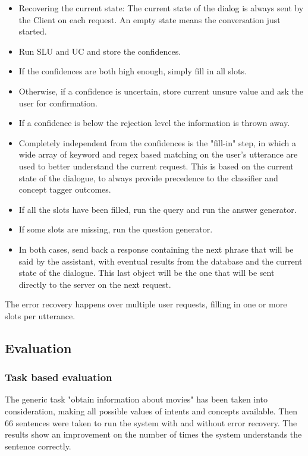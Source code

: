 \documentclass[11pt,a4paper]{article}
\begin{document}
\begin{itemize}
\item Recovering the current state: The current state of the dialog is always sent by the Client on each request. An empty state means the conversation just started.
\item Run SLU and UC and store the confidences.
\item If the confidences are both high enough, simply fill in all slots.
\item Otherwise, if a confidence is uncertain, store current unsure value and ask the user for confirmation.
\item If a confidence is below the rejection level the information is thrown away.
\item Completely independent from the confidences is the "fill-in" step, in which a wide array of keyword and regex based matching on the user's utterance are used to better understand the current request. This is based on the current state of the dialogue, to always provide precedence to the classifier and concept tagger outcomes.
\item If all the slots have been filled, run the query and run the answer generator.
\item If some slots are missing, run the question generator.
\item In both cases, send back a response containing the next phrase that will be said by the assistant, with eventual results from the database and the current state of the dialogue. This last object will be the one that will be sent directly to the server on the next request.
\end{itemize}

The error recovery happens over multiple user requests, filling in one or more slots per utterance.

\subsection{Evaluation}

\subsubsection{Task based evaluation}
The generic task "obtain information about movies" has been taken into consideration, making all possible values of intents and concepts available.
Then 66 sentences were taken to run the system with and without error recovery. The results show an improvement on the number of times the system understands the sentence correctly.
\end{document}

